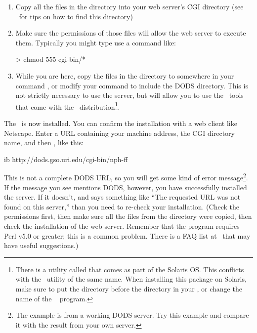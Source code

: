 \begin{enumerate}
\item Copy all the files in the  directory into your web
  server's CGI directory (see \DODSuser\ for tips on how to find this
  directory)
  
\item Make sure the permissions of those files will allow the web
  server to execute them.  Typically you might type use a command
  like:

\begin{example}
> chmod 555 cgi-bin/*    
\end{example}

\item While you are here, copy the files in the  directory to
  somewhere in your command , or modify your command
   to include the DODS  directory.  This is not
  strictly necessary to use the server, but will allow you to use the
  \ffnd\ tools that come with the \ffs\ distribution\footnote{There is
    a utility called  that comes as part of the Solaris
    OS.  This conflicts with the \ffnd\ utility of the same name.
    When installing this package on Solaris, make sure to put the
     directory before the  directory in your
    , or change the name of the \ffnd\  program.}.

\end{enumerate}

The \ffs\ is now installed.  You can confirm the installation with a
web client like Netscape.  Enter a URL containing your machine
address, the CGI directory name, and then , like this:

\begin{vcode}{ib}
http://dods.gso.uri.edu/cgi-bin/nph-ff
\end{vcode}

This is not a complete DODS URL, so you will get some kind of error
message\footnote{The example is from a working DODS server.  Try this
  example and compare it with the result from your own server.}.  If
the message you see mentions DODS, however, you have successfully
installed the server.  If it doesn't, and says something like ``The
requested URL was not found on this server,'' than you need to
re-check your installation.  (Check the permissions first, then make
sure all the files from the  directory were copied, then
check the installation of the web server.  Remember that the
 program requires Perl v5.0 or greater; this is a common
problem.  There is a FAQ list at \DODShome\ that may have useful
suggestions.)

